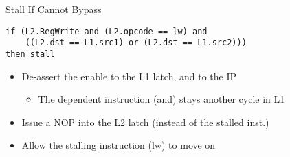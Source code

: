 \documentclass[aspectratio=169,12pt]{beamer}
\begin{document}
\begin{frame}[fragile]{Stall If Cannot Bypass}
    \begin{verbatim}
if (L2.RegWrite and (L2.opcode == lw) and 
    ((L2.dst == L1.src1) or (L2.dst == L1.src2))) 
then stall
    \end{verbatim}
    
    \vspace{0.5cm}
    \begin{itemize}
        \item De-assert the enable to the L1 latch, and to the IP
        \begin{itemize}
            \item The dependent instruction (and) stays another cycle in L1
        \end{itemize}
        \item Issue a NOP into the L2 latch (instead of the stalled inst.)
        \item Allow the stalling instruction (lw) to move on
    \end{itemize}
    
    \centering
\end{frame}
\end{document}
